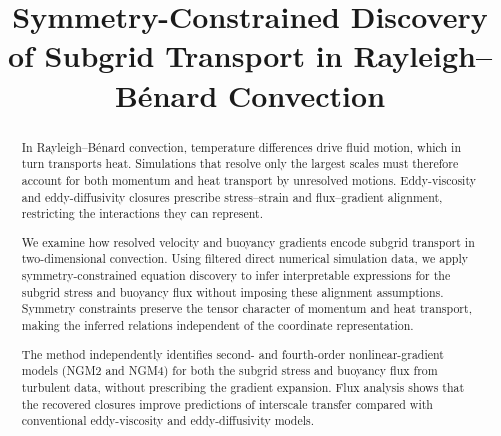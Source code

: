 \documentclass[11pt]{article}
\title{Symmetry-Constrained Discovery of Subgrid Transport in Rayleigh--B\'enard Convection}
\author{}
\date{}
\begin{document}
\maketitle

\begin{abstract}
    In Rayleigh--B\'enard convection, temperature differences drive fluid motion, which in turn transports heat. Simulations that resolve only the largest scales must therefore account for both momentum and heat transport by unresolved motions. Eddy-viscosity and eddy-diffusivity closures prescribe stress--strain and flux--gradient alignment, restricting the interactions they can represent.

    We examine how resolved velocity and buoyancy gradients encode subgrid transport in two-dimensional convection. Using filtered direct numerical simulation data, we apply symmetry-constrained equation discovery to infer interpretable expressions for the subgrid stress and buoyancy flux without imposing these alignment assumptions. Symmetry constraints preserve the tensor character of momentum and heat transport, making the inferred relations independent of the coordinate representation.

    The method independently identifies second- and fourth-order nonlinear-gradient models (NGM2 and NGM4) for both the subgrid stress and buoyancy flux from turbulent data, without prescribing the gradient expansion. Flux analysis shows that the recovered closures improve predictions of interscale transfer compared with conventional eddy-viscosity and eddy-diffusivity models.
\end{abstract}
\end{document}
